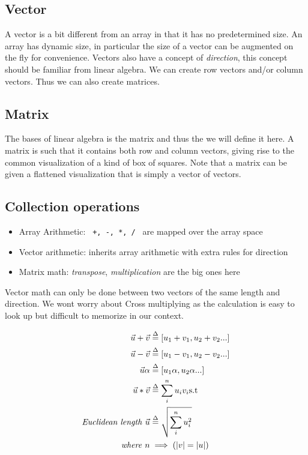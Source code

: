 \documentclass[12pt]{article}
\begin{document}
		\subsection{Vector}
			A vector is a bit different from an array in that it has no predetermined size.
			An array has dynamic size,
			in particular the size of a vector can be augmented on the fly for convenience.
			Vectors also have a concept of \emph{direction},
				this concept should be familiar from linear algebra.
			We can create row vectors and/or column vectors.
			Thus we can also create matrices.

		\subsection{Matrix}
			The bases of linear algebra is the matrix and thus the we will define it here.
			A matrix is such that it contains both row and column vectors,
				giving rise to the common visualization of a kind of box of squares.
			Note that a matrix can be given a flattened visualization that is simply a vector of vectors.

		\subsection{Collection operations}
			\begin{itemize}
				\item Array Arithmetic: \verb| +, -, *, / | are mapped over the array space
				\item Vector arithmetic: inherits array arithmetic with extra rules for direction
				\item Matrix math: \emph{transpose}, \emph{multiplication} are the big ones here
			\end{itemize}

			Vector math can only be done between two vectors of the same length and direction.
			We wont worry about Cross multiplying as the calculation is easy to look up but difficult to memorize in our context.

			\begin{align*}
				\vec{u} + \vec{v} &\stackrel{\text{$\Delta$}}{=} \lbrack u_1+v_1,u_2+v_2...\rbrack \\
				\vec{u} - \vec{v} &\stackrel{\text{$\Delta$}}{=} \lbrack u_1-v_1,u_2-v_2...\rbrack \\
				\vec{u}\alpha &\stackrel{\text{$\Delta$}}{=} \lbrack u_1\alpha,u_2\alpha...\rbrack \\
				\vec{u} * \vec{v} &\stackrel{\text{$\Delta$}}{=} \sum_i^n u_iv_i \text{s.t} \\
				\text{\emph{Euclidean length} }\vec{u} &\stackrel{\text{$\Delta$}}{=} \sqrt{\sum_i^n u_i^2} \\
				\text{\emph{where} } n &\implies (|v| = |u|)
			\end{align*}
\end{document}
